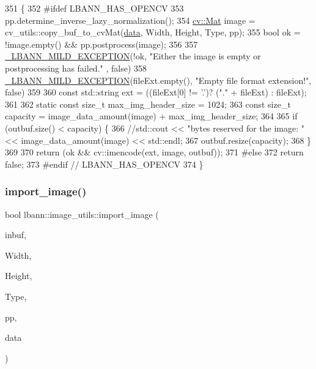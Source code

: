 \begin{DoxyCode}
351                                                                                                            
                     \{
352 \textcolor{preprocessor}{#ifdef LBANN\_HAS\_OPENCV}
353   pp.determine\_inverse\_lazy\_normalization();
354   \hyperlink{base_8hpp_a68f11fdc31b62516cb310831bbe54d73}{cv::Mat} image = cv\_utils::copy\_buf\_to\_cvMat(\hyperlink{namespacelbann_1_1cnpy__utils_a9ac86d96ccb1f8b4b2ea16441738781f}{data}, Width, Height, Type, pp);
355   \textcolor{keywordtype}{bool} ok = !image.empty() && pp.postprocess(image);
356 
357   \hyperlink{mild__exception_8hpp_a7b8339c566152ab29ce66b63e90c67f9}{\_LBANN\_MILD\_EXCEPTION}(!ok, \textcolor{stringliteral}{"Either the image is empty or postprocessing has failed."}
      , \textcolor{keyword}{false})
358   \hyperlink{mild__exception_8hpp_a7b8339c566152ab29ce66b63e90c67f9}{\_LBANN\_MILD\_EXCEPTION}(fileExt.empty(), "Empty file format extension!", false)
359 
360   const std::\textcolor{keywordtype}{string} ext = ((fileExt[0] != '.')? ("." + fileExt) : fileExt);
361 
362   static const \textcolor{keywordtype}{size\_t} max\_img\_header\_size = 1024;
363   const \textcolor{keywordtype}{size\_t} capacity = image\_data\_amount(image) + max\_img\_header\_size;
364 
365   if (outbuf.size() < capacity) \{
366     \textcolor{comment}{//std::cout << "bytes reserved for the image: " << image\_data\_amount(image) << std::endl;}
367     outbuf.resize(capacity);
368   \}
369 
370   \textcolor{keywordflow}{return} (ok && cv::imencode(ext, image, outbuf));
371 \textcolor{preprocessor}{#else}
372   \textcolor{keywordflow}{return} \textcolor{keyword}{false};
373 \textcolor{preprocessor}{#endif // LBANN\_HAS\_OPENCV}
374 \}
\end{DoxyCode}
\mbox{\label{classlbann_1_1image__utils_a720f0987ec8eff333bf697ed18aafc93}} 
\subsubsection{\texorpdfstring{import\+\_\+image()}{import\_image()}\hspace{0.1cm}{\footnotesize\ttfamily [1/2]}}
{\footnotesize\ttfamily bool lbann\+::image\+\_\+utils\+::import\+\_\+image (\begin{DoxyParamCaption}\item[{cv\+::\+Input\+Array}]{inbuf,  }\item[{int \&}]{Width,  }\item[{int \&}]{Height,  }\item[{int \&}]{Type,  }\item[{cv\+\_\+process \&}]{pp,  }\item[{\+::\hyperlink{base_8hpp_a68f11fdc31b62516cb310831bbe54d73}{Mat} \&}]{data }\end{DoxyParamCaption})\hspace{0.3cm}{\ttfamily [static]}}



